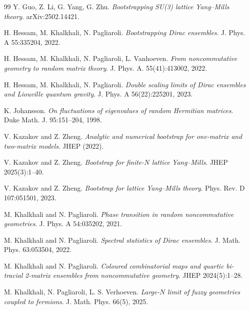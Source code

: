 \documentclass[11pt]{article}
\theoremstyle{plain}
\begin{document}
\begin{thebibliography}{99}
Y. Guo, Z. Li, G. Yang, G. Zhu.
\emph{Bootstrapping SU(3) lattice Yang–Mills theory}. arXiv:2502.14421.



H. Hessam, M. Khalkhali, N. Pagliaroli.
\emph{Bootstrapping Dirac ensembles}. J. Phys. A 55:335204, 2022.

H. Hessam, M. Khalkhali, N. Pagliaroli,  L.  Vanhoeven. \textit{From noncommutative geometry to random matrix theory}. J. Phys. A.  55(41):413002, 2022.

H. Hessam, M. Khalkhali, N. Pagliaroli.
\emph{Double scaling limits of Dirac ensembles and Liouville quantum gravity}. J. Phys. A 56(22):225201, 2023.




K. Johansson. \emph{On fluctuations of eigenvalues of random Hermitian matrices}. Duke Math. J. 95:151–204, 1998.








V. Kazakov and Z. Zheng. \emph{Analytic and numerical bootstrap for one-matrix and two-matrix models}. JHEP (2022).







V. Kazakov and Z. Zheng. \emph{Bootstrap for finite-$N$ lattice Yang–Mills}. JHEP 2025(3):1–40.

V. Kazakov and Z. Zheng. \emph{Bootstrap for lattice Yang–Mills theory}. Phys. Rev. D 107:051501, 2023.

M. Khalkhali and N. Pagliaroli. \emph{Phase transition in random noncommutative geometries}. J. Phys. A 54:035202, 2021.

M. Khalkhali and N. Pagliaroli. \emph{Spectral statistics of Dirac ensembles}. J. Math. Phys. 63:053504, 2022.



M. Khalkhali and N. Pagliaroli.
\emph{Coloured combinatorial maps and quartic bi-tracial 2-matrix ensembles from noncommutative geometry}. JHEP 2024(5):1–28.

M. Khalkhali, N. Pagliaroli, L. S. Verhoeven.
\emph{Large-$N$ limit of fuzzy geometries coupled to fermions}. J. Math. Phys. 66(5), 2025.


\end{thebibliography}
\end{document}
